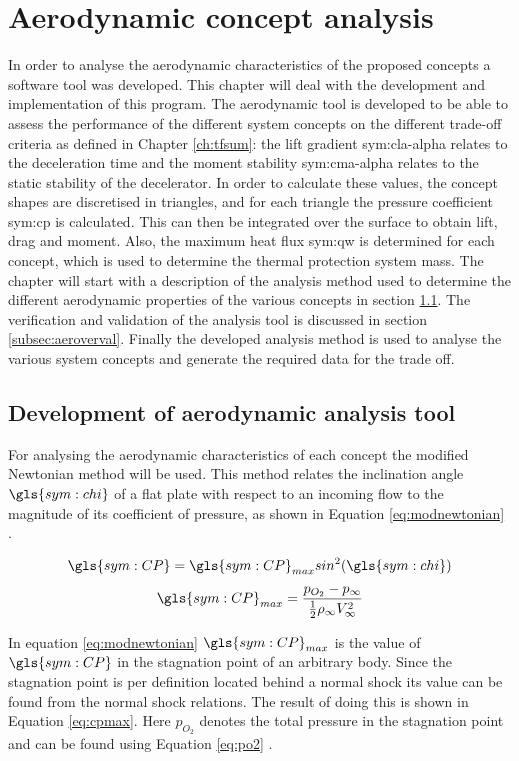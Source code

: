\section{Aerodynamic concept analysis}
\label{ch:aero_analysis}
In order to analyse the aerodynamic characteristics of the proposed concepts a software tool was developed. This chapter will deal with the development and implementation of this program. The aerodynamic tool is developed to be able to assess the performance of the different system concepts on the different trade-off criteria as defined in Chapter \ref{ch:tfsum}: the lift gradient \gls{sym:cla-alpha} relates to the deceleration time and the moment stability \gls{sym:cma-alpha} relates to the static stability of the decelerator. In order to calculate these values, the concept shapes are discretised in triangles, and for each triangle the pressure coefficient \gls{sym:cp} is calculated. This can then be integrated over the surface to obtain lift, drag and moment. Also, the maximum heat flux \gls{sym:qw} is determined for each concept, which is used to determine the thermal protection system mass. 
The chapter will start with a description of the analysis method used to determine the different aerodynamic properties of the various concepts in section \ref{subsec:aerotool}. The verification and validation of the analysis tool is discussed in section \ref{subsec:aeroverval}. Finally the developed analysis method is used to analyse the various system concepts and generate the required data for the trade off. 

\subsection{Development of aerodynamic analysis tool}
\label{subsec:aerotool}
For analysing the aerodynamic characteristics of each concept the modified Newtonian method will be used. This method relates the inclination angle $\gls{sym:chi}$ of a flat plate with respect to an incoming flow to the magnitude of its coefficient of pressure, as shown in Equation \ref{eq:modnewtonian} \cite{AndersonJr.2006}.
\begin{multicols}{2}
\begin{equation}
\gls{sym:CP}=\gls{sym:CP}_{max}sin^{2}(\gls{sym:chi})
\label{eq:modnewtonian}
\end{equation} \break
\begin{equation}
\gls{sym:CP}_{max}=\frac{p_{O_{2}}-p_{\infty}}{\frac{1}{2}\rho_{\infty}V_{\infty}^{2}}
\label{eq:cpmax}
\end{equation}
\end{multicols}
In equation \ref{eq:modnewtonian} $\gls{sym:CP}_{max}$ is the value of $\gls{sym:CP}$ in the stagnation point of an arbitrary body. Since the stagnation point is per definition located behind a normal shock its value can be found from the normal shock relations. The result of doing this is shown in Equation \ref{eq:cpmax}. Here $p_{O_{2}}$ denotes the total pressure in the stagnation point and can be found using Equation \ref{eq:po2} \cite{AndersonJr.2007}.


